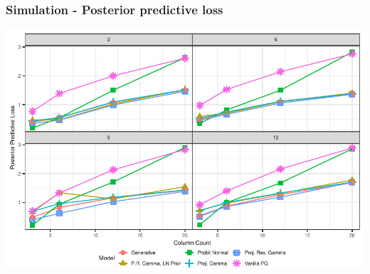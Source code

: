 \documentclass[aspectratio=169]{beamer}
\begin{document}
\begin{frame}
  \frametitle{Simulation - Posterior predictive loss}
  \begin{center}
    \includegraphics[width=0.9\linewidth]{./images/simulation_ppl}
  \end{center}
\end{frame}
\end{document}
